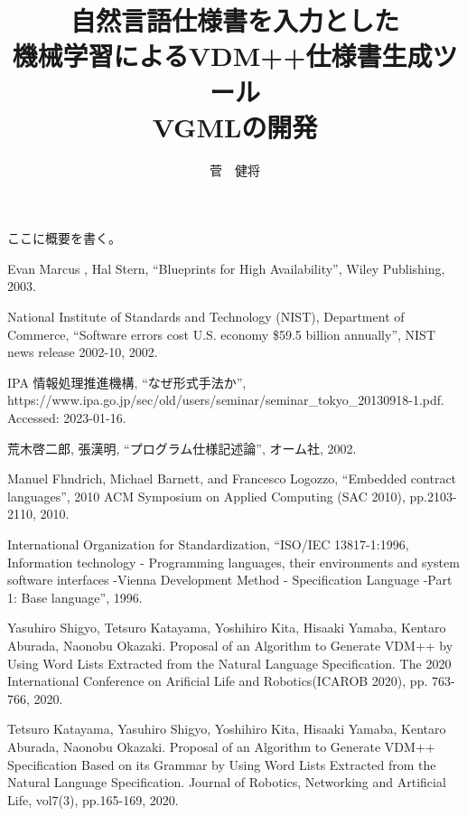 \documentclass[uplatex, report, a4j, 10pt]{jsbook}
\title{自然言語仕様書を入力とした\\機械学習によるVDM++仕様書生成ツール\\VGMLの開発}
\author{菅　健将}
\begin{document}
\maketitle

%
% 
ここに概要を書く。


%
% 








%


%
\begin{thebibliography}{10}
     Evan Marcus , Hal Stern, “Blueprints for High Availability”, Wiley Publishing, 2003. 

     National Institute of Standards and Technology (NIST), Department of Commerce, “Software errors cost U.S. economy \$59.5 billion annually”, NIST news release 2002-10, 2002. 

     IPA 情報処理推進機構,  “なぜ形式手法か”, https:\slash \slash www.ipa.go.jp\slash sec\slash old\slash users\slash seminar\slash seminar\_tokyo\_20130918-1.pdf. Accessed: 2023-01-16.

     荒木啓二郎, 張漢明,  “プログラム仕様記述論”, オーム社, 2002.

     Manuel Fhndrich, Michael Barnett, and Francesco Logozzo, “Embedded contract languages”, 2010 ACM Symposium on Applied Computing (SAC 2010), pp.2103-2110, 2010.
	 
     International Organization for Standardization, “ISO/IEC 13817-1:1996, Information technology - Programming languages, their environments and system software interfaces -Vienna Development Method - Specification Language -Part 1: Base language”, 1996.
    
    Yasuhiro Shigyo, Tetsuro Katayama, Yoshihiro Kita, Hisaaki Yamaba, Kentaro Aburada, Naonobu Okazaki. 
    Proposal of an Algorithm to Generate VDM++ by Using Word Lists Extracted from the Natural Language Specification. 
    The 2020 International Conference on Arificial Life and Robotics(ICAROB 2020), 
    pp. 763-766, 2020.
    
    Tetsuro Katayama, Yasuhiro Shigyo, Yoshihiro Kita, Hisaaki Yamaba, Kentaro Aburada, Naonobu Okazaki. 
    Proposal of an Algorithm to Generate VDM++ Specification Based on its Grammar by Using Word Lists Extracted from the Natural Language Specification. 
    Journal of Robotics, Networking and Artiﬁcial Life, vol7(3), pp.165-169, 2020.


\end{thebibliography}
\end{document}
